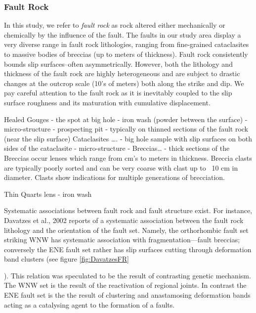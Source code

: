 \documentclass[12pt,a4paper]{article}
\begin{document}
{\subsubsection{Fault Rock} 


    

	


In this study, we refer to \textit{fault rock} as rock altered either mechanically or chemically by the influence of the fault. The faults in our study area display a very diverse range in fault rock lithologies, ranging from fine-grained cataclasites to massive  bodies of breccias (up to meters of thickness). Fault rock consistently bounds slip surfaces--often asymmetrically.  However,  both the lithology and thickness of the fault rock are highly heterogeneous and are subject to drastic changes at the outcrop scale (10’s of meters) both along the strike and dip. We pay careful attention to the fault rock as it is inevitably coupled to the slip surface roughness and its maturation with cumulative displacement. 

Healed Gouges
-	the spot at big hole
-	iron wash (powder between the surface)
-	micro-structure
-	prospecting pit
-	typically on thinned sections of the fault rock (near the slip surface)
Cataclasites ….
-	big hole sample with slip surfaces on both sides of the cataclasite
-	micro-structure
-	
Breccias…
-	thick sections  of the 
Breccias occur lenses which range from cm’s to meters in thickness. Breccia clasts are typically poorly sorted and can be very coarse with clast up to ~10 cm in diameter. Clasts show indications for multiple generations of brecciation.

Thin Quarts lens
-	iron wash


Systematic associations between fault rock and fault structure exist. For instance, Davatzes et al., 2002 reports of a systematic association between the fault rock lithology and the orientation of the fault set. Namely, the orthorhombic fault set striking WNW has systematic association with fragmentation—fault breccias; conversely the ENE fault set rather has slip surfaces cutting through deformation band clusters (see figure \ref{fig:DavatzesFR}}). This relation was speculated to be the result of contrasting genetic mechanism. The WNW set is the result of the reactivation of regional joints. In contrast the ENE fault set is the the result of clustering and anastamosing deformation bands acting as a catalysing agent to the formation of a faults.
\end{document}
